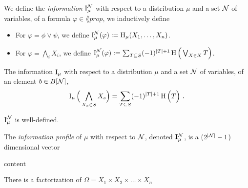 \documentclass{article}
\begin{document}
\begin{defn}
    We define the \emph{information} $\operatorname{\mathrm{I}}_\mu^\mathcal N$ with respect to a distribution $\mu$ and a set $\mathcal N$ of variables, of a formula $\varphi \in \lang{prop}$, we inductively define
            \begin{itemize}[itemsep=0pt, parsep=1pt]
                \item For $\varphi = \phi \lor \psi$, we define $\operatorname{\mathrm{I}}^\mathcal N_\mu(\varphi) := \operatorname{\mathrm{H}}_\mu(X_1, \ldots, X_n)$.
                \item For $\varphi = \bigwedge_i X_i$, we define $\operatorname{\mathrm{I}}^\mathcal N_\mu(\varphi)
                     := \sum_{T \subseteq S} (-1)^{|T|+1} \operatorname{\mathrm{H}}\Big(\bigvee_{X \in X} T\Big)$.
            \end{itemize}
\end{defn}

    \begin{defn}
        The information $\operatorname{\mathrm{I}}_\mu$ with respect to a distribution $\mu$ and a set $\mathcal N$ of variables, of an element $b \in B[\mathcal N]$,
    \[          \operatorname{\mathrm{I}}_\mu\Big(\bigwedge_{X_x \in S} X_s\Big) =  \sum_{T \subseteq S} (-1)^{|T|+1} \operatorname{\mathrm{H}}\Big( T \Big) ~. \]
    \end{defn}

    \begin{prop}
        $\operatorname{\mathrm{I}}_\mu^\mathcal N$ is well-defined.
    \end{prop}

    \begin{defn}
        The \emph{information profile} of $\mu$ with respect to $\mathcal N$, denoted $\mathbf I_\mu^\mathcal N$, is a ($2^{|\mathcal N|} -1$) dimensional vector
    \end{defn}

    \begin{example}
        content
    \end{example}



    \begin{prop}
        There is a factorization of $\Omega = X_1 \times X_2 \times \ldots \times X_n$
    \end{prop}
\end{document}
